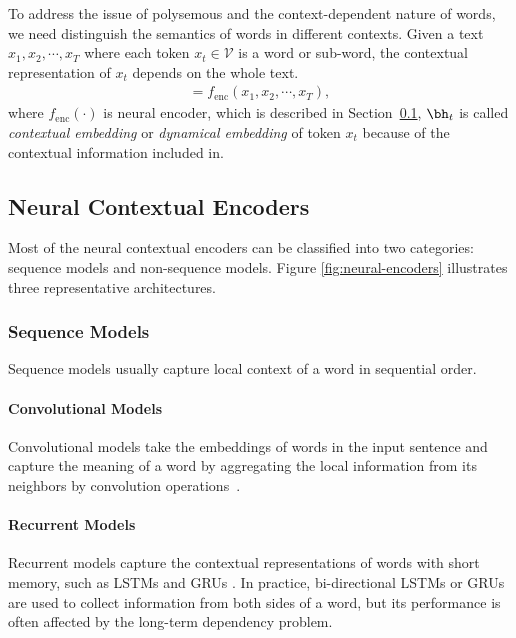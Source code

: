 \documentclass[fleqn]{SCYE-arxiv}
\begin{document}
\begin{multicols}{2}
To address the issue of polysemous and the context-dependent nature of words, we need
distinguish the semantics of words in different contexts. Given a text $x_1,x_2,\cdots,x_T$ where each token $x_t\in \mathcal{V}$ is a word or sub-word, the contextual representation of $x_t$ depends on the whole text.
\begin{align}
[\bh_1,\bh_2,\cdots,\bh_T] = f_{\mathrm{enc}}(x_1,x_2,\cdots,x_T),
\end{align}
where $f_{\mathrm{enc}}(\cdot)$ is neural encoder, which is described in Section~\ref{sec:neural-encoders}, $\bh_t$ is called \textit{contextual embedding} or \textit{dynamical embedding} of token $x_t$ because of the contextual information included in.


\subsection{Neural Contextual Encoders}
\label{sec:neural-encoders}

Most of the neural contextual encoders can be classified into two categories: sequence models and non-sequence models. Figure \ref{fig:neural-encoders} illustrates three representative architectures.


\subsubsection{Sequence Models}

Sequence models usually capture local context of a word in sequential order.

\paragraph{Convolutional Models}
Convolutional models take the embeddings of words in the input sentence and capture the meaning of a word by aggregating the local information from its neighbors by convolution operations~\cite{kim2014convolutional}.



\paragraph{Recurrent Models}
Recurrent models capture the contextual representations of words with short memory, such as LSTMs \cite{DBLP:journals/neco/HochreiterS97} and GRUs \cite{chung2014empirical}.
In practice, bi-directional LSTMs or GRUs are used to collect information from both sides of a word, but its performance is often affected by the long-term dependency problem.


\end{multicols}
\end{document}

